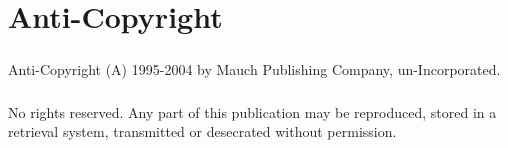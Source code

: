 \chapter{Anti-Copyright}


\paragraph{}
Anti-Copyright (A)
1995-2004 by Mauch Publishing Company, un-Incorporated.

\paragraph{}
No rights reserved.  Any part of this publication may be reproduced, stored
in a retrieval system, transmitted or desecrated without permission.


\raggedbottom
